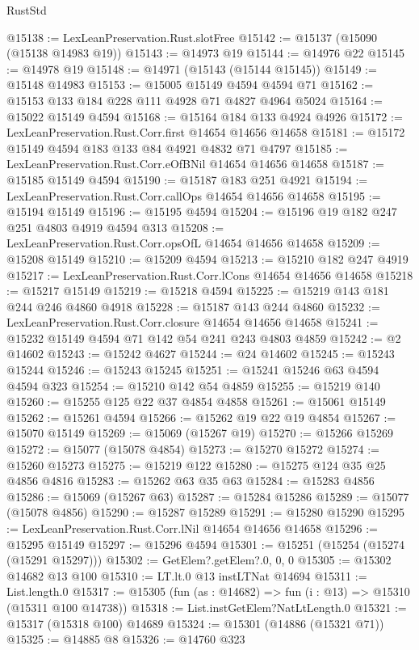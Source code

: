 \begin{lexlean}{RustStd}
\begin{coremodule}
@15138 := LexLeanPreservation.Rust.slotFree
@15142 := @15137 (@15090 (@15138 @14983 @19))
@15143 := @14973 @19
@15144 := @14976 @22
@15145 := @14978 @19
@15148 := @14971 (@15143 (@15144 @15145))
@15149 := @15148 @14983
@15153 := @15005 @15149 @4594 @4594 @71
@15162 := @15153 @133 @184 @228 @111 @4928 @71 @4827 @4964 @5024
@15164 := @15022 @15149 @4594
@15168 := @15164 @184 @133 @4924 @4926
@15172 := LexLeanPreservation.Rust.Corr.first @14654 @14656 @14658
@15181 := @15172 @15149 @4594 @183 @133 @84 @4921 @4832 @71 @4797
@15185 := LexLeanPreservation.Rust.Corr.eOfBNil @14654 @14656 @14658
@15187 := @15185 @15149 @4594
@15190 := @15187 @183 @251 @4921
@15194 := LexLeanPreservation.Rust.Corr.callOps @14654 @14656 @14658
@15195 := @15194 @15149
@15196 := @15195 @4594
@15204 := @15196 @19 @182 @247 @251 @4803 @4919 @4594 @313
@15208 := LexLeanPreservation.Rust.Corr.opsOfL @14654 @14656 @14658
@15209 := @15208 @15149
@15210 := @15209 @4594
@15213 := @15210 @182 @247 @4919
@15217 := LexLeanPreservation.Rust.Corr.lCons @14654 @14656 @14658
@15218 := @15217 @15149
@15219 := @15218 @4594
@15225 := @15219 @143 @181 @244 @246 @4860 @4918
@15228 := @15187 @143 @244 @4860
@15232 := LexLeanPreservation.Rust.Corr.closure @14654 @14656 @14658
@15241 := @15232 @15149 @4594 @71 @142 @54 @241 @243 @4803 @4859
@15242 := @2 @14602
@15243 := @15242 @4627
@15244 := @24 @14602
@15245 := @15243 @15244
@15246 := @15243 @15245
@15251 := @15241 @15246 @63 @4594 @4594 @323
@15254 := @15210 @142 @54 @4859
@15255 := @15219 @140
@15260 := @15255 @125 @22 @37 @4854 @4858
@15261 := @15061 @15149
@15262 := @15261 @4594
@15266 := @15262 @19 @22 @19 @4854
@15267 := @15070 @15149
@15269 := @15069 (@15267 @19)
@15270 := @15266 @15269
@15272 := @15077 (@15078 @4854)
@15273 := @15270 @15272
@15274 := @15260 @15273
@15275 := @15219 @122
@15280 := @15275 @124 @35 @25 @4856 @4816
@15283 := @15262 @63 @35 @63
@15284 := @15283 @4856
@15286 := @15069 (@15267 @63)
@15287 := @15284 @15286
@15289 := @15077 (@15078 @4856)
@15290 := @15287 @15289
@15291 := @15280 @15290
@15295 := LexLeanPreservation.Rust.Corr.lNil @14654 @14656 @14658
@15296 := @15295 @15149
@15297 := @15296 @4594
@15301 := @15251 (@15254 (@15274 (@15291 @15297)))
@15302 := GetElem?.getElem?.{0, 0, 0}
@15305 := @15302 @14682 @13 @100
@15310 := LT.lt.{0} @13 instLTNat @14694
@15311 := List.length.{0}
@15317 := @15305 (fun (as : @14682) => fun (i : @13) => @15310 (@15311 @100 @14738))
@15318 := List.instGetElem?NatLtLength.{0}
@15321 := @15317 (@15318 @100) @14689
@15324 := @15301 (@14886 (@15321 @71))
@15325 := @14885 @8
@15326 := @14760 @323

\end{coremodule}
\end{lexlean}
